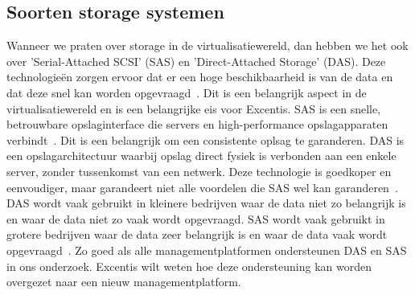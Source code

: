 \subsection{Soorten storage systemen}
Wanneer we praten over storage in de virtualisatiewereld, dan hebben we het ook over 'Serial-Attached SCSI' (SAS) en 'Direct-Attached Storage' (DAS). Deze technologieën zorgen ervoor dat er een hoge beschikbaarheid is van de data en dat deze snel kan worden opgevraagd~\autocite{griswold2002storage}. Dit is een belangrijk aspect in de virtualisatiewereld en is een belangrijke eis voor Excentis.
SAS is een snelle, betrouwbare opslaginterface die servers en high-performance opslagapparaten verbindt~\autocite{aravindan2014performance}. Dit is een belangrijk om een consistente oplsag te garanderen. DAS is een opslagarchitectuur waarbij opslag direct fysiek is verbonden aan een enkele server, zonder tussenkomst van een netwerk. Deze technologie is goedkoper en eenvoudiger, maar garandeert niet alle voordelen die SAS wel kan garanderen~\autocite{griswold2002storage}.
DAS wordt vaak gebruikt in kleinere bedrijven waar de data niet zo belangrijk is en waar de data niet zo vaak wordt opgevraagd. SAS wordt vaak gebruikt in grotere bedrijven waar de data zeer belangrijk is en waar de data vaak wordt opgevraagd~\autocite{griswold2002storage}.
Zo goed als alle managementplatformen ondersteunen DAS en SAS in ons onderzoek. Excentis wilt weten hoe deze ondersteuning kan worden overgezet naar een nieuw managementplatform.


